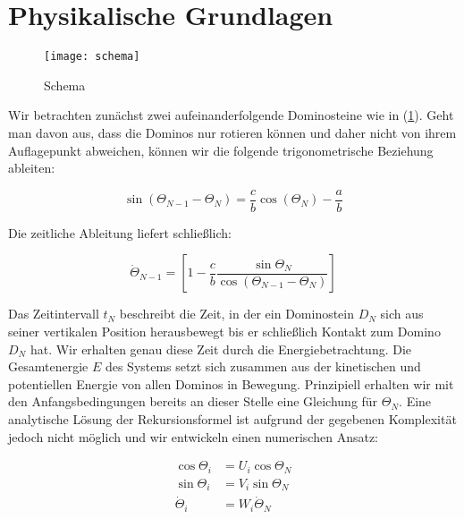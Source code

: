 \section{Physikalische Grundlagen \label{Grundlagen}}

\begin{figure}[h!]
    \centering
    \texttt{[image: schema]}
    \caption{Schema}
    \label{abb:1}
\end{figure}

\noindent
Wir betrachten zunächst zwei aufeinanderfolgende Dominosteine wie in
(\ref{abb:1}). Geht man davon aus, dass die Dominos nur rotieren können und
daher nicht von ihrem Auflagepunkt abweichen, können wir die folgende
trigonometrische Beziehung ableiten:

\begin{equation}
    \sin(\Theta_{N-1} - \Theta_{N}) = \frac{c}{b} \cos(\Theta_{N}) - \frac{a}{b}
    \label{eq:1}
\end{equation}

\noindent
Die zeitliche Ableitung liefert schließlich:

\begin{equation}
    \dot{\Theta}_{N-1} = \left[
        1-\frac{c}{b}
        \frac{\sin{\Theta_{N}}}
        {\cos{\left(\Theta_{N-1}-\Theta_{N}\right)}}
    \right]
    \label{eq:2}
\end{equation}

Das Zeitintervall $t_N$ beschreibt die Zeit, in der ein Dominostein $D_N$ sich
aus seiner vertikalen Position herausbewegt bis er schließlich Kontakt zum
Domino $D_N$ hat. Wir erhalten genau diese Zeit durch die Energiebetrachtung.
Die Gesamtenergie $E$ des Systems setzt sich zusammen aus der kinetischen und
potentiellen Energie von allen Dominos in Bewegung.
Prinzipiell erhalten wir mit den Anfangsbedingungen bereits an dieser Stelle
eine Gleichung für $\Theta_N$. Eine analytische Lösung der Rekursionsformel ist
aufgrund der gegebenen Komplexität jedoch nicht möglich und wir entwickeln
einen numerischen Ansatz:

\begin{equation}
    \begin{split}
        \cos{\Theta_i} & = U_i\cos{\Theta_N} \nonumber \\
        \sin{\Theta_i} & = V_i\sin{\Theta_N} \label{eq:3} \\
        \dot{\Theta}_i & = W_i\dot{\Theta}_N \nonumber
    \end{split}
\end{equation}

